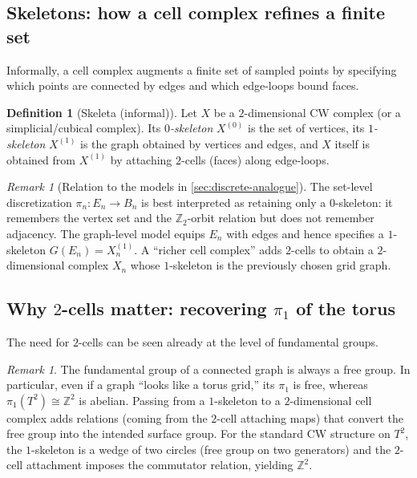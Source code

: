 \documentclass[11pt,a4paper]{article}
\theoremstyle{definition}
\newtheorem{definition}[theorem]{Definition}
\theoremstyle{remark}
\newtheorem{remark}[theorem]{Remark}
\begin{document}
\subsection{Skeletons: how a cell complex refines a finite set}
\label{sec:skeletons}

Informally, a cell complex augments a finite set of sampled points by specifying which points are connected by edges and which edge-loops bound faces.

\begin{definition}[Skeleta (informal)]
\label{def:skeleta-informal}
Let \(X\) be a \(2\)-dimensional CW complex (or a simplicial/cubical complex). Its \emph{\(0\)-skeleton} \(X^{(0)}\) is the set of vertices, its \emph{\(1\)-skeleton} \(X^{(1)}\) is the graph obtained by vertices and edges, and \(X\) itself is obtained from \(X^{(1)}\) by attaching \(2\)-cells (faces) along edge-loops.
\end{definition}

\begin{remark}[Relation to the models in \cref{sec:discrete-analogue}]
\label{rem:points-graphs-cells}
The set-level discretization \(\pi_n:E_n\to B_n\) is best interpreted as retaining only a \(0\)-skeleton: it remembers the vertex set and the \(\mathbb{Z}_2\)-orbit relation but does not remember adjacency. The graph-level model equips \(E_n\) with edges and hence specifies a \(1\)-skeleton \(G(E_n)=X_n^{(1)}\). A ``richer cell complex'' adds \(2\)-cells to obtain a \(2\)-dimensional complex \(X_n\) whose \(1\)-skeleton is the previously chosen grid graph.
\end{remark}

\subsection{Why \(2\)-cells matter: recovering \(\pi_1\) of the torus}
\label{sec:two-cells-matter}

The need for \(2\)-cells can be seen already at the level of fundamental groups.

\begin{remark}
\label{rem:pi1-graph-vs-surface}
The fundamental group of a connected graph is always a free group. In particular, even if a graph ``looks like a torus grid,'' its \(\pi_1\) is free, whereas \(\pi_1(T^2)\cong \mathbb{Z}^2\) is abelian. Passing from a \(1\)-skeleton to a \(2\)-dimensional cell complex adds relations (coming from the \(2\)-cell attaching maps) that convert the free group into the intended surface group. For the standard CW structure on \(T^2\), the \(1\)-skeleton is a wedge of two circles (free group on two generators) and the \(2\)-cell attachment imposes the commutator relation, yielding \(\mathbb{Z}^2\).
\end{remark}
\end{document}
